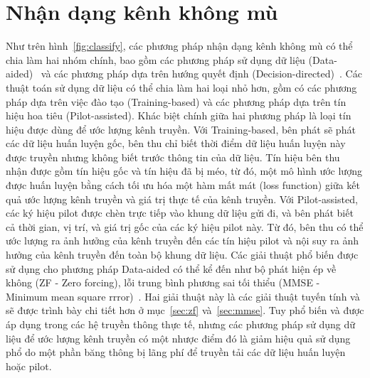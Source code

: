 \section{Nhận dạng kênh không mù}
Như trên hình~\ref{fig:classify}, các phương pháp nhận dạng kênh không mù có thể chia làm hai nhóm chính, bao gồm các phương pháp sử dụng dữ liệu (Data-aided)~\cite{vilas2022} và các phương pháp dựa trên hướng quyết định (Decision-directed)~\cite{Ozdemir2007}. Các thuật toán sử dụng dữ liệu có thể chia làm hai loại nhỏ hơn, gồm có các phương pháp dựa trên việc đào tạo (Training-based) và các phương pháp dựa trên tín hiệu hoa tiêu (Pilot-assisted). Khác biệt chính giữa hai phương pháp là loại tín hiệu được dùng để ước lượng kênh truyền. Với Training-based, bên phát sẽ phát các dữ liệu huấn luyện gốc, bên thu chỉ biết thời điểm dữ liệu huấn luyện này được truyền nhưng không biết trước thông tin của dữ liệu. Tín hiệu bên thu nhận được gồm tín hiệu gốc và tín hiệu đã bị méo, từ đó, một mô hình ước lượng được huấn luyện bằng cách tối ưu hóa một hàm mất mát (loss function) giữa kết quả ước lượng kênh truyền và giá trị thực tế của kênh truyền. Với Pilot-assisted, các ký hiệu pilot được chèn trực tiếp vào khung dữ liệu gửi đi, và bên phát biết cả thời gian, vị trí, và giá trị gốc của các ký hiệu pilot này. Từ đó, bên thu có thể ước lượng ra ảnh hưởng của kênh truyền đến các tín hiệu pilot và nội suy ra ảnh hưởng của kênh truyền đến toàn bộ khung dữ liệu. Các giải thuật phổ biến được sử dụng cho phương pháp Data-aided có thể kể đến như bộ phát hiện ép về không (ZF - Zero forcing), lỗi trung bình phương sai tối thiểu (MMSE - Minimum mean square rrror)~\cite{Jiang2011}. Hai giải thuật này là các giải thuật tuyến tính và sẽ được trình bày chi tiết hơn ở mục~\ref{sec:zf} và~\ref{sec:mmse}. Tuy phổ biến và được áp dụng trong các hệ truyền thông thực tế, nhưng các phương pháp sử dụng dữ liệu để ước lượng kênh truyền có một nhược điểm đó là giảm hiệu quả sử dụng phổ do một phần băng thông bị lãng phí để truyền tải các dữ liệu huấn luyện hoặc pilot. 

